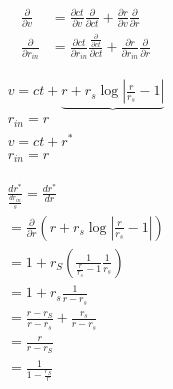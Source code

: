 \begin{equation}
    \begin{aligned}
        \frac{\partial}{\partial v}       & =\frac{\partial c t}{\partial v} \frac{\partial}{\partial c t}+\frac{\partial r}{\partial v} \frac{\partial}{\partial r}                                  \\
        \frac{\partial}{\partial r_{i n}} & =\frac{\partial c t}{\partial r_{i n}} \frac{\frac{\partial}{\partial c t}}{\partial c t}+\frac{\partial r}{\partial r_{i n}} \frac{\partial}{\partial r}
    \end{aligned}
\end{equation}


\begin{equation}
    \begin{array}{l}
        v=c t+\underbrace{r+r_s \log \left|\frac{r}{r_s}-1\right|} \\
        r_{i n}=r                                                  \\
        v=c t+r^*                                                  \\
        r_{i n}=r
    \end{array}
\end{equation}

\begin{equation}
    \begin{array}{l}
        \frac{d r^*}{\frac{d r_{i n}}{s}}=\frac{d r^*}{d r}                              \\
        =\frac{\partial}{\partial r}\left(r+r_s \log \left|\frac{r}{r_s}-1\right|\right) \\
        =1+r_S\left(\frac{1}{\frac{r}{r_s}-1} \frac{1}{r_s}\right)                       \\
        =1+r_s \frac{1}{r-r_s}                                                           \\
        =\frac{r-r_S}{r-r_s}+\frac{r_s}{r-r_s}                                           \\
        =\frac{r}{r-r_S}                                                                 \\
        =\frac{1}{1-\frac{r_S}{r}}
    \end{array}
\end{equation}


